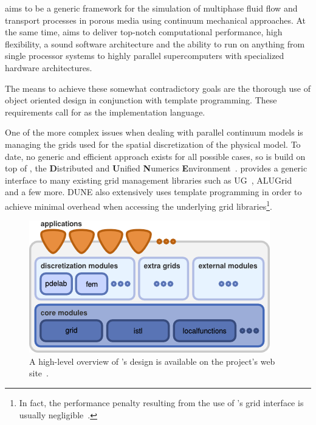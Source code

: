 \Dumux aims to be a generic framework for the simulation of multiphase
fluid flow and transport processes in porous media using continuum
mechanical approaches.  At the same time, \Dumux aims to deliver
top-notch computational performance, high flexibility, a sound
software architecture and the ability to run on anything from single
processor systems to highly parallel supercomputers with specialized
hardware architectures.

The means to achieve these somewhat contradictory goals are the
thorough use of object oriented design in conjunction with template
programming. These requirements call for \Cplusplus as the implementation
language.

One of the more complex issues when dealing with parallel continuum
models is managing the grids used for the spatial discretization of
the physical model. To date, no generic and efficient approach exists
for all possible cases, so \Dumux is build on top of \Dune, the
\textbf{D}istributed and \textbf{U}nified \textbf{N}umerics
\textbf{E}nvironment~\cite{DUNE-HP}. \Dune provides a generic interface
to many existing grid management libraries such as UG~\cite{UG-HP},
ALUGrid~\cite{ALUGRID-HP,alugrid2016} and a few more.
DUNE also extensively uses template programming in order to
achieve minimal overhead when accessing the underlying grid
libraries\footnote{In fact, the performance penalty resulting from the
use of \Dune's grid interface is usually negligible~\cite{BURRI2006}.}.
\begin{figure}[hbt]
  \centering
  \includegraphics[width=.5\linewidth, keepaspectratio]{PNG/dunedesign.png}
  \caption{
    \label{fig:dune-design}
    A high-level overview of \Dune's design is available on the project's
    web site~\cite{DUNE-HP}.
  }
\end{figure}

